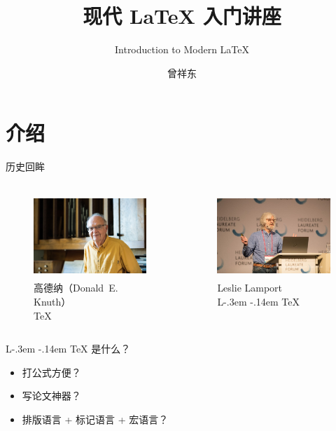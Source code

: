\documentclass[fontset=none]{ctexbeamer}
\title{现代 \LaTeX{} 入门讲座}
\subtitle{Introduction to Modern \LaTeX{}}
\author{曾祥东}
\institute{复旦大学\quad 物理系}
\date{\zhdate{2018/12/6}}
\DeclareRobustCommand{\LaTeX}{%
  L\kern-.3em%
  \raisebox{.2em}{\textsc{a}}\kern-.14em%
  \TeX}
\begin{document}
\maketitle
\iffalse
\section{介绍}

\begin{frame}{历史回眸}
\begin{columns}
\begin{column}{0.45\textwidth}
  \begin{figure}
    \centering
    \includegraphics[height=3.2cm]{figures/Knuth-vivian20181019E.jpg}
    \caption{高德纳（Donald~E. Knuth）\footnotemark \\ \TeX}
  \end{figure}
\end{column}
\begin{column}{0.45\textwidth}
  \begin{figure}
    \centering
    \includegraphics[height=3.2cm]{figures/lamport-2018.jpg}
    \caption{Leslie Lamport~\footnotemark \\ \LaTeX}
  \end{figure}
\end{column}
\end{columns}
\end{frame}

\begin{frame}{\LaTeX{} 是什么？}
\begin{itemize}
  \item 打公式方便？
  \item 写论文神器？
  \item 排版语言 + 标记语言 + 宏语言？
\end{itemize}
\end{frame}
\end{document}

